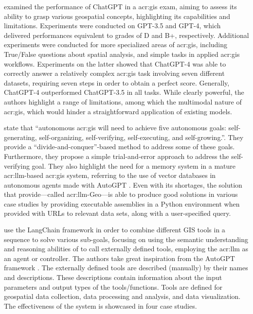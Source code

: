 \cite{mooneyUnderstandingGeospatialSkills2023} examined the performance of ChatGPT in a \acrfull{acr:gis} exam, aiming to assess its ability to grasp various geospatial concepts, highlighting its capabilities and limitations. Experiments were conducted on GPT-3.5 and GPT-4, which delivered performances equivalent to grades of D and B+, respectively. Additional experiments were conducted for more specialized areas of \acrshort{acr:gis}, including True/False questions about spatial analysis, and simple tasks in applied \acrshort{acr:gis} workflows. Experiments on the latter showed that ChatGPT-4 was able to correctly answer a relatively complex \acrshort{acr:gis} task involving seven different datasets, requiring seven steps in order to obtain a perfect score. Generally, ChatGPT-4 outperformed ChatGPT-3.5 in all tasks. While clearly powerful, the authors highlight a range of limitations, among which the multimodal nature of \acrshort{acr:gis}, which would hinder a straightforward application of existing models.

\cite{liAutonomousGISNextgeneration2023} state that \enquote{autonomous \acrshort{acr:gis} will need to achieve five autonomous goals: self-generating, self-organizing, self-verifying, self-executing, and self-growing.}. They provide a \enquote{divide-and-conquer}-based method to address some of these goals. Furthermore, they propose a simple trial-and-error approach to address the self-verifying goal. They also highlight the need for a memory system in a mature \acrshort{acr:llm}-based \acrshort{acr:gis} system, referring to the use of vector databases in autonomous agents made with AutoGPT \citep{richardAutoGPTHeartOpensource2023}. Even with its shortages, the solution that \cite{liAutonomousGISNextgeneration2023} provide---called \acrshort{acr:llm}-Geo---is able to produce good solutions in various case studies by providing executable assemblies in a Python environment when provided with URLs to relevant data sets, along with a user-specified query.

\cite{zhangGeoGPTUnderstandingProcessing2023} use the LangChain framework in order to combine different GIS tools in a sequence to solve various sub-goals, focusing on using the semantic understanding and reasoning abilities of  to call externally defined tools, employing the \acrshort{acr:llm} as an agent or controller. The authors take great inspiration from the AutoGPT framework \citep{richardAutoGPTHeartOpensource2023}. The externally defined tools are described (manually) by their names and descriptions. These descriptions contain information about the input parameters and output types of the tools/functions. Tools are defined for geospatial data collection, data processing and analysis, and data visualization. The effectiveness of the system is showcased in four case studies.


